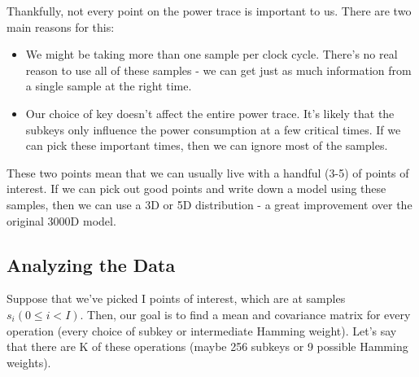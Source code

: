     Thankfully, not every point on the power trace is important to us. There are
    two main reasons for this:
    \begin{itemize}
      \item We might be taking more than one sample per clock cycle.  There's no
      real reason to use all of these samples - we can get just as much
      information from a single sample at the right time.
      \item Our choice of key doesn't affect the entire power trace. It's likely
      that the subkeys only influence the power consumption at a few critical
      times. If we can pick these important times, then we can ignore most of
      the samples. 
    \end{itemize}
    
    These two points mean that we can usually live with a handful (3-5) of
    points of interest. If we can pick out good points and write down a model
    using these samples, then we can use a 3D or 5D distribution - a great
    improvement over the original 3000D model.
   \subsection{Analyzing the Data}
    Suppose that we've picked I points of interest, which are at samples $s_i (0
    \le i < I)$. Then, our goal is to find a mean and covariance matrix for
    every operation (every choice of subkey or intermediate Hamming weight).
    Let's say that there are K of these operations (maybe 256 subkeys or 9
    possible Hamming weights).
    
